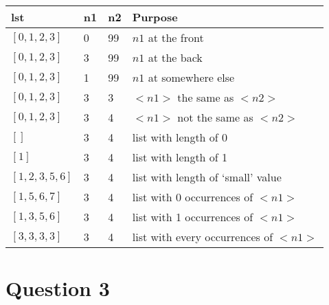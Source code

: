 \documentclass[12pt]{article}
\begin{document}
\begin{itemize}
\begin{mdframed}
        \begin{tabular}{|p{5cm}|p{1cm}|p{1cm}|p{6cm}|}
            \hline
            \textbf{lst} & \textbf{n1} & \textbf{n2} & \textbf{Purpose}\\
            \hline
            $[0,1,2,3]$ & 0 & 99 & $n1$ at the front\\
            \hline
            $[0,1,2,3]$ & \color{red}3\color{black} & 99 & $n1$ at the back\\
            \hline
            $[0,1,2,3]$ & \color{red}1\color{black} & 99 & $n1$ at somewhere else\\
            \hline
            $[0,1,2,3]$ & 3 & 3 & $<n1>$ the same as $<n2>$\\
            \hline
            $[0,1,2,3]$ & 3 & 4 & $<n1>$ not the same as $<n2>$\\
            \hline
            $[]$ & 3 & 4 & list with length of 0\\
            \hline
            $[1]$ & 3 & 4 & list with length of 1\\
            \hline
            $[1,2,3,5,6]$ & 3 & 4 & list with length of `small' value\\
            \hline
            $[1,5,6,7]$ & 3 & 4 & list with 0 occurrences of $<n1>$\\
            \hline
            $[1,3,5,6]$ & 3 & 4 & list with 1 occurrences of $<n1>$\\
            \hline
            $[3,3,3,3]$ & 3 & 4 & list with every occurrences of $<n1>$\\
            \hline
        \end{tabular}
    \end{mdframed}
\end{itemize}

\section*{Question 3}
\end{document}
